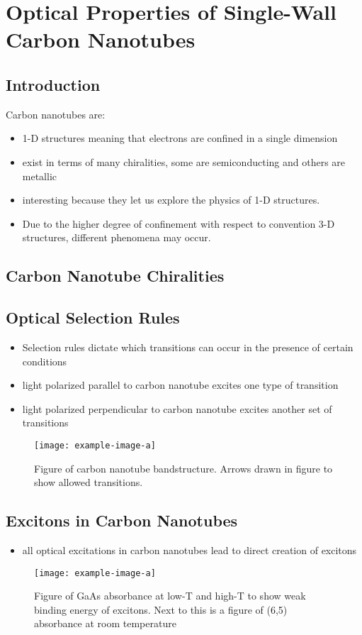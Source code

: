 \chapter{Optical Properties of Single-Wall Carbon Nanotubes}

\section{Introduction}
Carbon nanotubes are:
\begin{itemize}
	\item 1-D structures meaning that electrons are confined in a single dimension
	\item exist in terms of many chiralities, some are semiconducting and others are metallic
	\item interesting because they let us explore the physics of 1-D structures. 
	\item Due to the higher degree of confinement with respect to convention 3-D structures, different phenomena may occur.
\end{itemize}

\section{Carbon Nanotube Chiralities}

\section{Optical Selection Rules}
\begin{itemize}
	\item Selection rules dictate which transitions can occur in the presence of certain conditions
	\item light polarized parallel to carbon nanotube excites one type of transition
	\item light polarized perpendicular to carbon nanotube excites another set of transitions
\end{itemize}

\begin{figure}[h]
	\centering
	\texttt{[image: example-image-a]}
	\caption{Figure of carbon nanotube bandstructure. Arrows drawn in figure to show allowed transitions.}
	\label{fig:beam_diamter_measurement}
\end{figure}

\section{Excitons in Carbon Nanotubes}
\begin{itemize}
	\item all optical excitations in carbon nanotubes lead to direct creation of excitons
\end{itemize}

\begin{figure}[h]
	\centering
	\texttt{[image: example-image-a]}
	\caption{Figure of GaAs absorbance at low-T and high-T to show weak binding energy of excitons. Next to this is a figure of  (6,5) absorbance at room temperature}
	\label{fig:gaas_vs_cnt_absorbance}
\end{figure}

